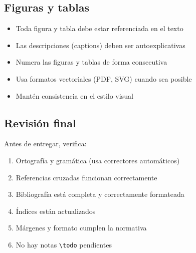 \subsection{Figuras y tablas}

\begin{itemize}
  \item Toda figura y tabla debe estar referenciada en el texto
  \item Las descripciones (captions) deben ser autoexplicativas
  \item Numera las figuras y tablas de forma consecutiva
  \item Usa formatos vectoriales (PDF, SVG) cuando sea posible
  \item Mantén consistencia en el estilo visual
\end{itemize}

\subsection{Revisión final}

Antes de entregar, verifica:

\begin{enumerate}
  \item Ortografía y gramática (usa correctores automáticos)
  \item Referencias cruzadas funcionan correctamente
  \item Bibliografía está completa y correctamente formateada
  \item Índices están actualizados
  \item Márgenes y formato cumplen la normativa
  \item No hay notas \texttt{\textbackslash todo} pendientes
\end{enumerate}

